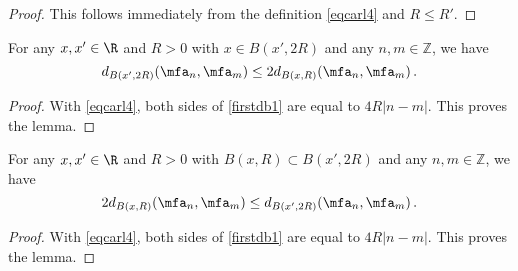 \begin{proof}
    This follows immediately from the definition \eqref{eqcarl4} and $R \le R'$.
\end{proof}

\begin{lemma}
\label{frequency-ball-doubling}
  For any $x,x'\in \R$ and $R>0$ with
   $x\in B(x',2R)$ and any $n,m\in \mathbb{Z}$, we have
\begin{equation}\label{firstdb1}
    d_{B(x',2R)}(\mfa_n,\mfa_m)\le 2 d_{B(x,R)}(\mfa_n,\mfa_m) \, .
\end{equation}
\end{lemma}
\begin{proof}
With \eqref{eqcarl4}, both sides of \eqref{firstdb1} are equal to $4R|n-m|$. This proves the lemma.
\end{proof}

\begin{lemma}
\label{frequency-ball-growth}
    For any $x,x'\in \R$ and $R>0$ with
   $B(x,R)\subset B(x',2R)$ and any $n,m\in \mathbb{Z}$, we have
\begin{equation}\label{seconddb1}
    2d_{B(x,R)}(\mfa_n,\mfa_m)\le d_{B(x',2R)}(\mfa_n,\mfa_m) \, .
\end{equation}
\end{lemma}
\begin{proof}
With \eqref{eqcarl4}, both sides of \eqref{firstdb1} are equal to $4R|n-m|$. This proves the lemma.
\end{proof}

